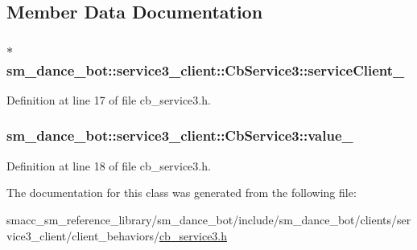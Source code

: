 \subsection{Member Data Documentation}
\subsubsection[{\texorpdfstring{service\+Client\+\_\+}{serviceClient_}}]{$\ast$ sm\+\_\+dance\+\_\+bot\+::service3\+\_\+client\+::\+Cb\+Service3\+::service\+Client\+\_\+\hspace{0.3cm}{\ttfamily [private]}}\hypertarget{classsm__dance__bot_1_1service3__client_1_1CbService3_af0d87e9fa611b477f2504884b432b218}{}\label{classsm__dance__bot_1_1service3__client_1_1CbService3_af0d87e9fa611b477f2504884b432b218}


Definition at line 17 of file cb\+\_\+service3.\+h.

\subsubsection[{\texorpdfstring{value\+\_\+}{value_}}]{ sm\+\_\+dance\+\_\+bot\+::service3\+\_\+client\+::\+Cb\+Service3\+::value\+\_\+\hspace{0.3cm}{\ttfamily [private]}}\hypertarget{classsm__dance__bot_1_1service3__client_1_1CbService3_aaa2ff5b19ca8f09bdcd903df4cdd427a}{}\label{classsm__dance__bot_1_1service3__client_1_1CbService3_aaa2ff5b19ca8f09bdcd903df4cdd427a}


Definition at line 18 of file cb\+\_\+service3.\+h.



The documentation for this class was generated from the following file\+:\begin{DoxyCompactItemize}
\item 
smacc\+\_\+sm\+\_\+reference\+\_\+library/sm\+\_\+dance\+\_\+bot/include/sm\+\_\+dance\+\_\+bot/clients/service3\+\_\+client/client\+\_\+behaviors/\hyperlink{cb__service3_8h}{cb\+\_\+service3.\+h}\end{DoxyCompactItemize}
